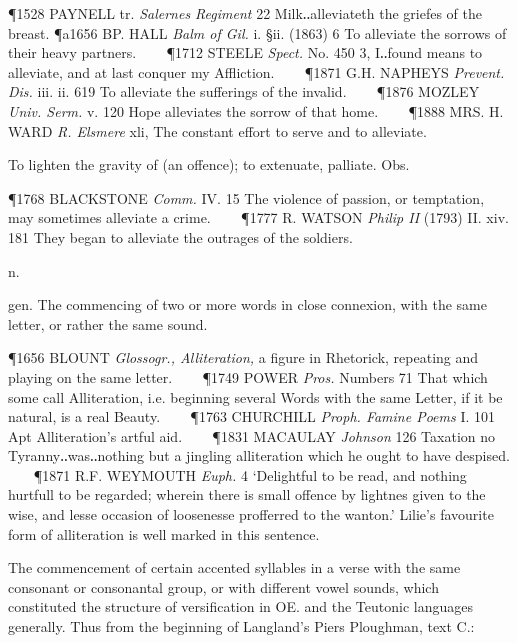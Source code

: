 \begin{description}[wide, labelwidth=!, labelindent=0pt]
\begin{myenumerate}
\P 1528 PAYNELL tr. \textit{Salernes Regiment} 22 Milk‥alleviateth the griefes of the breast.
\P a1656 BP. HALL \textit{Balm of Gil.} i. §ii. (1863) 6 To alleviate the sorrows of their heavy partners.    
\P 1712 STEELE \textit{Spect.} No. 450 3, I‥found means to alleviate, and at last conquer my Affliction.    
\P 1871 G.H. NAPHEYS \textit{Prevent. Dis.} iii. ii. 619 To alleviate the sufferings of the invalid.    
\P 1876 MOZLEY \textit{Univ. Serm.} v. 120 Hope alleviates the sorrow of that home.    
\P 1888 MRS. H. WARD \textit{R. Elsmere} xli, The constant effort to serve and to alleviate.

 To lighten the gravity of (an offence); to extenuate, palliate. Obs. 

\P 1768 BLACKSTONE \textit{Comm.} IV. 15 The violence of passion, or temptation, may sometimes alleviate a crime.    
\P 1777 R. WATSON \textit{Philip II} (1793) II. xiv. 181 They began to alleviate the outrages of the soldiers.
\end{myenumerate}

  n.

\noindent  {}

\vspace{-0.3cm}

\begin{myenumerate}
 gen. The commencing of two or more words in close connexion, with the same letter, or rather the same sound. 

\P 1656 BLOUNT \textit{Glossogr., Alliteration,} a figure in Rhetorick, repeating and playing on the same letter.    
\P 1749 POWER \textit{Pros.} Numbers 71 That which some call Alliteration, i.e. beginning several Words with the same Letter, if it be natural, is a real Beauty.    
\P 1763 CHURCHILL \textit{Proph. Famine Poems} I. 101 Apt Alliteration's artful aid.    
\P 1831 MACAULAY \textit{Johnson} 126 Taxation no Tyranny‥was‥nothing but a jingling alliteration which he ought to have despised.    
\P 1871 R.F. WEYMOUTH \textit{Euph.} 4 ‘Delightful to be read, and nothing hurtfull to be regarded; wherein there is small offence by lightnes given to the wise, and lesse occasion of loosenesse profferred to the wanton.’ Lilie's favourite form of alliteration is well marked in this sentence.

 The commencement of certain accented syllables in a verse with the same consonant or consonantal group, or with different vowel sounds, which constituted the structure of versification in OE. and the Teutonic languages generally. Thus from the beginning of Langland's Piers Ploughman, text C.:


\end{myenumerate}
\end{description}
